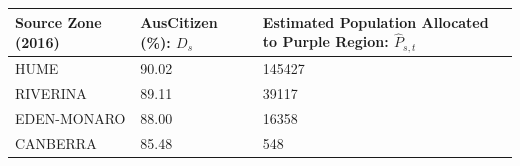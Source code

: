 \documentclass[11pt,a4paper,]{article}
\begin{document}
\begin{longtable}[]{@{}lll@{}}
\toprule
\begin{minipage}[b]{0.26\columnwidth}\raggedright
Source Zone (2016)\strut
\end{minipage} & \begin{minipage}[b]{0.19\columnwidth}\raggedright
AusCitizen (\%): \(D_s\)\strut
\end{minipage} & \begin{minipage}[b]{0.47\columnwidth}\raggedright
Estimated Population Allocated to Purple Region: \(\hat{P}_{s,t}\)\strut
\end{minipage}\tabularnewline
\midrule
\endhead
\begin{minipage}[t]{0.26\columnwidth}\raggedright
HUME\strut
\end{minipage} & \begin{minipage}[t]{0.19\columnwidth}\raggedright
90.02\strut
\end{minipage} & \begin{minipage}[t]{0.47\columnwidth}\raggedright
145427\strut
\end{minipage}\tabularnewline
\begin{minipage}[t]{0.26\columnwidth}\raggedright
RIVERINA\strut
\end{minipage} & \begin{minipage}[t]{0.19\columnwidth}\raggedright
89.11\strut
\end{minipage} & \begin{minipage}[t]{0.47\columnwidth}\raggedright
39117\strut
\end{minipage}\tabularnewline
\begin{minipage}[t]{0.26\columnwidth}\raggedright
EDEN-MONARO\strut
\end{minipage} & \begin{minipage}[t]{0.19\columnwidth}\raggedright
88.00\strut
\end{minipage} & \begin{minipage}[t]{0.47\columnwidth}\raggedright
16358\strut
\end{minipage}\tabularnewline
\begin{minipage}[t]{0.26\columnwidth}\raggedright
CANBERRA\strut
\end{minipage} & \begin{minipage}[t]{0.19\columnwidth}\raggedright
85.48\strut
\end{minipage} & \begin{minipage}[t]{0.47\columnwidth}\raggedright
548\strut
\end{minipage}\tabularnewline

\end{longtable}
\end{document}
